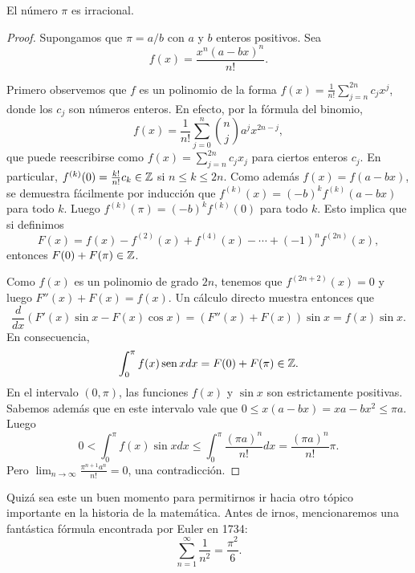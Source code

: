 \begin{theorem}
	El número $\pi$ es irracional.	
\end{theorem}

\begin{proof}
	Supongamos que $\pi=a/b$ con $a$ y $b$ enteros positivos. Sea 
	\[
		f(x)=\frac{x^n(a-bx)^n}{n!}.
	\]

	Primero observemos que $f$ es un polinomio de la forma
	$f(x)=\frac{1}{n!}\sum_{j=n}^{2n}c_jx^j$, donde los $c_j$ son números
	enteros. En efecto, por la fórmula del binomio, 
	\[
		f(x)=\frac{1}{n!}\sum_{j=0}^n\binom{n}{j}a^jx^{2n-j},
	\]
	que puede reescribirse como $f(x)=\sum_{j=n}^{2n}c_jx_j$ para ciertos
	enteros $c_j$.  En particular, $f^{(k)}(0)=\frac{k!}{n!}c_k\in\mathbb{Z}$ si $n\leq
	k\leq 2n$. Como además $f(x)=f(a-bx)$, se demuestra fácilmente por
	inducción que $f^{(k)}(x)=(-b)^kf^{(k)}(a-bx)$ para todo $k$. Luego
	$f^{(k)}(\pi)=(-b)^kf^{(k)}(0)$ para todo $k$. Esto implica que si definimos 
	\[
	F(x)=f(x)-f^{(2)}(x)+f^{(4)}(x)-\cdots+(-1)^nf^{(2n)}(x), 
	\]
	entonces $F(0)+F(\pi)\in\mathbb{Z}$. 

	Como $f(x)$ es un polinomio de grado $2n$, tenemos que $f^{(2n+2)}(x)=0$ y
	luego $F''(x)+F(x)=f(x)$.  Un cálculo directo muestra entonces que
	\[
		\frac{d}{dx}\left( F'(x)\sin x-F(x)\cos x\right)=(F''(x)+F(x))\sin x=f(x)\sin x.
	\]
	En consecuencia, 
	\[
		\int_0^\pi f(x)\operatorname{sen} xdx=F(0)+F(\pi)\in\mathbb{Z}.
	\]
	En el intervalo $(0,\pi)$, las funciones $f(x)$ y $\sin x$ son estrictamente positivas.
	Sabemos además que en este intervalo vale que $0\leq x(a-bx)=xa-bx^2\leq
	\pi a$. 
	Luego
	\[
		0<\int_0^\pi f(x)\sin xdx\leq \int_0^\pi \frac{(\pi a)^n}{n!}dx=\frac{(\pi a)^n}{n!}\pi.
	\]
	Pero $\displaystyle{\lim_{n\to\infty}\frac{\pi^{n+1}a^n}{n!}=0}$, una contradicción.
\end{proof}


Quizá sea este un buen momento para permitirnos ir hacia otro tópico importante
en la historia de la matemática. Antes de irnos, mencionaremos una fantástica
fórmula encontrada por Euler en 1734: 
\begin{equation}
	\label{eq:pi^2/6}
\sum_{n=1}^{\infty}\frac{1}{n^2}=\frac{\pi^2}{6}.
\end{equation}

